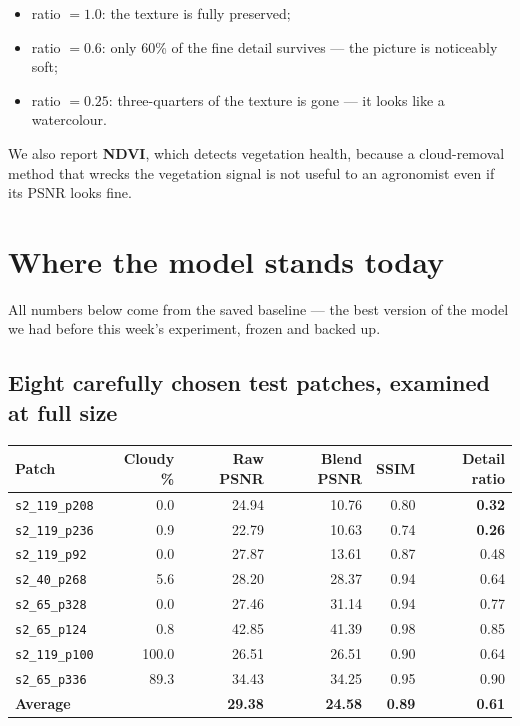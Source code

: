 \documentclass[11pt,a4paper]{article}
\newcommand{\code}[1]{\texttt{#1}}
\newcommand{\term}[1]{\textbf{#1}}
\begin{document}
\begin{itemize}
\item ratio $= 1.0$: the texture is fully preserved;
\item ratio $= 0.6$: only 60\% of the fine detail survives --- the picture is noticeably soft;
\item ratio $= 0.25$: three-quarters of the texture is gone --- it looks like a watercolour.
\end{itemize}

We also report \term{NDVI}, which detects vegetation health, because a cloud-removal method that
wrecks the vegetation signal is not useful to an agronomist even if its PSNR looks fine.

\section{Where the model stands today}

All numbers below come from the saved baseline --- the best version of the model we had before this
week's experiment, frozen and backed up.

\subsection{Eight carefully chosen test patches, examined at full size}

\begin{center}
\begin{tabular}{@{}lrrrrr@{}}
\hline
Patch & Cloudy \% & Raw PSNR & Blend PSNR & SSIM & Detail ratio \\
\hline
\code{s2\_119\_p208} & 0.0 & 24.94 & 10.76 & 0.80 & \textbf{0.32} \\
\code{s2\_119\_p236} & 0.9 & 22.79 & 10.63 & 0.74 & \textbf{0.26} \\
\code{s2\_119\_p92}  & 0.0 & 27.87 & 13.61 & 0.87 & 0.48 \\
\code{s2\_40\_p268}  & 5.6 & 28.20 & 28.37 & 0.94 & 0.64 \\
\code{s2\_65\_p328}  & 0.0 & 27.46 & 31.14 & 0.94 & 0.77 \\
\code{s2\_65\_p124}  & 0.8 & 42.85 & 41.39 & 0.98 & 0.85 \\
\code{s2\_119\_p100} & 100.0 & 26.51 & 26.51 & 0.90 & 0.64 \\
\code{s2\_65\_p336}  & 89.3 & 34.43 & 34.25 & 0.95 & 0.90 \\
\hline
\textbf{Average} & & \textbf{29.38} & \textbf{24.58} & \textbf{0.89} & \textbf{0.61} \\
\hline
\end{tabular}
\end{center}
\end{document}
